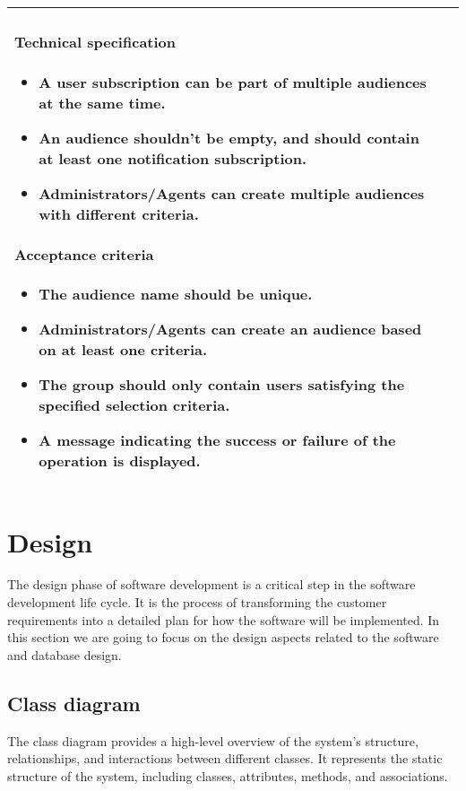 \begin{longtable}{ | m{} | m{} | }
    \paragraph*{Technical specification} \mbox{} \newline
    \begin{itemize}
        \item A user subscription can be part of multiple audiences at the same time.
        \item An audience shouldn't be empty, and should contain at least one notification subscription.
        \item Administrators/Agents can create multiple audiences with different criteria.
    \end{itemize}
    \paragraph*{Acceptance criteria} \mbox{} \newline
    \begin{itemize}
        \item The audience name should be unique.
        \item Administrators/Agents can create an audience based on at least one criteria.
        \item The group should only contain users satisfying the specified selection criteria.
        \item A message indicating the success or failure of the operation is displayed.
    \end{itemize}                                                                                                                                                                                 \\
    \hline
\end{longtable}

\section{Design}
The design phase of software development is a critical step in the software development life cycle.
It is the process of transforming the customer requirements into a detailed plan for how the software
will be implemented. In this section we are going to focus on the design aspects related to the software
and database design.

\subsection{Class diagram}
The class diagram provides a high-level overview of the system's structure, relationships,
and interactions between different classes. It represents the static structure of the system,
including classes, attributes, methods, and associations.

